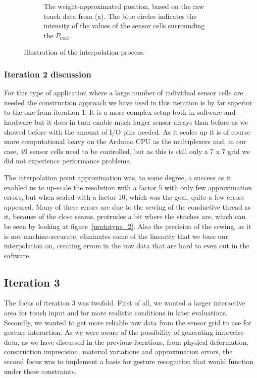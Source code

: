 \begin{figure}[h]
\begin{subfigure}[t]{.44\textwidth}
  \caption{The weight-approximated position, based on the raw touch data from (a). The blue circles indicates the intensity of the values of the sensor cells surrounding the \(P_{max}\).}
\end{subfigure}
\caption{Illustration of the interpolation process.}
\label{fig:ch:touch:interpolation}
\end{figure}

\subsubsection{Iteration 2 discussion}
For this type of application where a large number of individual sensor cells are needed the construction approach we have used in this iteration is by far superior to the one from iteration 1.
It is a more complex setup both in software and hardware but it does in turn enable much larger sensor arrays than before as we showed before with the amount of I/O pins needed.
As it scales up it is of course more computational heavy on the Arduino CPU as the multiplexers and, in our case, 49 sensor cells need to be controlled, but as this is still only a 7 x 7 grid we did not experience performance problems.

The interpolation point approximation was, to some degree, a success as it enabled us to up-scale the resolution with a factor 5 with only few approximation errors, but when scaled with a factor 10, which was the goal, quite a few errors appeared.
Many of these errors are due to the sewing of the conductive thread as it, because of the close seams, protrudes a bit where the stitches are, which can be seen by looking at figure~\ref{prototype_2}.
Also the precision of the sewing, as it is not machine-accurate, eliminates some of the linearity that we base our interpolation on, creating errors in the raw data that are hard to even out in the software.

\subsection{Iteration 3}
\label{ch:textiletouch:it3}
The focus of iteration 3 was twofold.
First of all, we wanted a larger interactive area for touch input and for more realistic conditions in later evaluations.
Secondly, we wanted to get more reliable raw data from the sensor grid to use for gesture interaction.
As we were aware of the possibility of generating imprecise data, as we have discussed in the previous iterations, from physical deformation, construction imprecision, material variations and approximation errors, the second focus was to implement a basis for gesture recognition that would function under these constraints.

